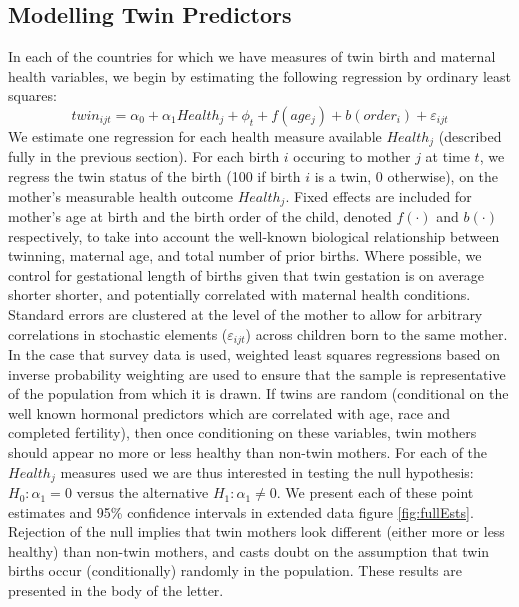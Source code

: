 \documentclass{nature}
\begin{document}
\begin{linenumbers}
\subsection{Modelling Twin Predictors}
In each of the countries for which we have measures of twin birth and maternal health variables, we begin by estimating the following regression by ordinary least squares:
\begin{equation}
  twin_{ijt}=\alpha_0 + \alpha_1 Health_j + \phi_t + f(age_j) + b(order_i) + \varepsilon_{ijt}
\end{equation}
We estimate one regression for each health measure available $Health_j$ (described fully in the previous section).  For each birth $i$ occuring to mother $j$ at time $t$, we regress the twin status of the birth (100 if birth $i$ is a twin, 0 otherwise), on the mother's measurable health outcome $Health_j$. Fixed effects are included for mother's age at birth and the birth order of the child, denoted $f(\cdot)$ and $b(\cdot)$ respectively, to take into account the well-known biological relationship between twinning, maternal age, and total number of prior births.  Where possible, we control for gestational length of births given that twin gestation is on average shorter shorter, and potentially correlated with maternal health conditions\cite{Morrison2005}.  Standard errors are clustered at the level of the mother to allow for arbitrary correlations in stochastic elements ($\varepsilon_{ijt}$) across children born to the same mother. In the case that survey data is used, weighted least squares regressions based on inverse probability weighting are used to ensure that the sample is representative of the population from which it is drawn. If twins are random (conditional on the well known  hormonal predictors which are correlated with age, race and completed fertility\cite{Hall2003}), then once conditioning on these variables, twin mothers should appear no more or less healthy than non-twin mothers.  For each of the $Health_j$ measures used we are thus interested in testing the null hypothesis: $H_0: \alpha_1=0$ versus the alternative $H_1: \alpha_1\neq0$.  We present each of these point estimates and 95\% confidence intervals in extended data figure \ref{fig:fullEsts}. Rejection of the null implies that twin mothers look different (either more or less healthy) than non-twin mothers, and casts doubt on the assumption that twin births occur (conditionally) randomly in the population.  These results are presented in the body of the letter.




\end{linenumbers}
\end{document}

